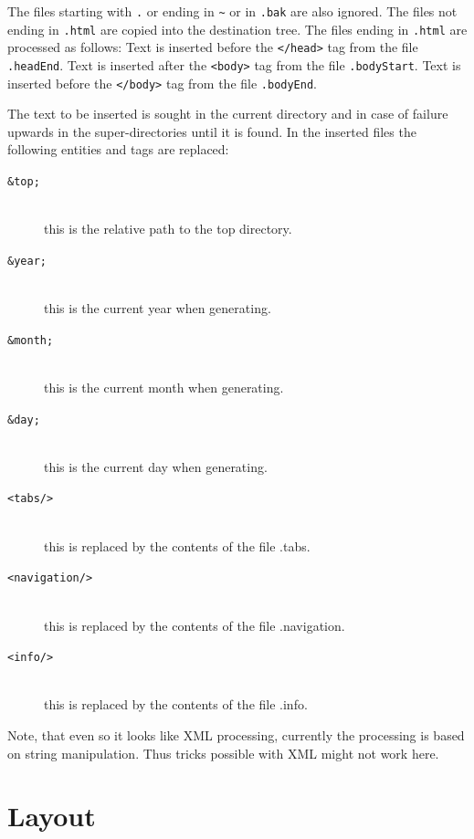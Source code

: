 \documentclass{extex-doc}
\newcommand\File[1]{\texttt{#1}}
\begin{document}
The files starting with \verb|.| or ending in \verb|~| or in
\texttt{.bak} are also ignored. The files not ending in \verb|.html|
are copied into the destination tree. The files ending in \verb|.html|
are processed as follows: Text is inserted before the \verb|</head>|
tag from the file \File{.headEnd}. Text is inserted after the
\verb|<body>| tag from the file \File{.bodyStart}. Text is inserted
before the \verb|</body>| tag from the file \File{.bodyEnd}.

The text to be inserted is sought in the current directory and in case
of failure upwards in the super-directories until it is found. In the
inserted files the following entities and tags are replaced:

\begin{description}
\item [\tt\&top;]\ \\
  this is the relative path to the top directory.
\item [\tt\&year;]\ \\
  this is the current year when generating.
\item [\tt\&month;]\ \\
  this is the current month when generating.
\item [\tt\&day;]\ \\
  this is the current day when generating.
\item [\tt<tabs/>]\ \\
  this is replaced by the contents of the file .tabs.
\item [\tt<navigation/>]\ \\
  this is replaced by the contents of the file .navigation.
\item [\tt<info/>]\ \\
  this is replaced by the contents of the file .info.
\end{description}

Note, that even so it looks like XML processing, currently the
processing is based on string manipulation. Thus tricks possible with
XML might not work here.

\section{Layout}
\end{document}

